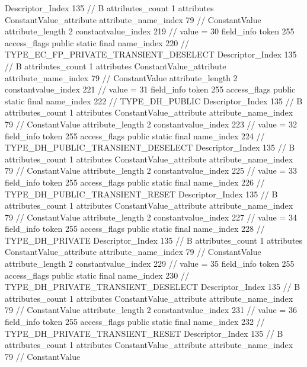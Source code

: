 {{{{{				Descriptor_Index	135		// B
				attributes_count	1
				attributes {
				ConstantValue_attribute {
					attribute_name_index	79		// ConstantValue
					attribute_length	2
					constantvalue_index	219		// value = 30
				}
				}
			}
			field_info {
				token	255
				access_flags	public static final
				name_index	220		// TYPE_EC_FP_PRIVATE_TRANSIENT_DESELECT
				Descriptor_Index	135		// B
				attributes_count	1
				attributes {
				ConstantValue_attribute {
					attribute_name_index	79		// ConstantValue
					attribute_length	2
					constantvalue_index	221		// value = 31
				}
				}
			}
			field_info {
				token	255
				access_flags	public static final
				name_index	222		// TYPE_DH_PUBLIC
				Descriptor_Index	135		// B
				attributes_count	1
				attributes {
				ConstantValue_attribute {
					attribute_name_index	79		// ConstantValue
					attribute_length	2
					constantvalue_index	223		// value = 32
				}
				}
			}
			field_info {
				token	255
				access_flags	public static final
				name_index	224		// TYPE_DH_PUBLIC_TRANSIENT_DESELECT
				Descriptor_Index	135		// B
				attributes_count	1
				attributes {
				ConstantValue_attribute {
					attribute_name_index	79		// ConstantValue
					attribute_length	2
					constantvalue_index	225		// value = 33
				}
				}
			}
			field_info {
				token	255
				access_flags	public static final
				name_index	226		// TYPE_DH_PUBLIC_TRANSIENT_RESET
				Descriptor_Index	135		// B
				attributes_count	1
				attributes {
				ConstantValue_attribute {
					attribute_name_index	79		// ConstantValue
					attribute_length	2
					constantvalue_index	227		// value = 34
				}
				}
			}
			field_info {
				token	255
				access_flags	public static final
				name_index	228		// TYPE_DH_PRIVATE
				Descriptor_Index	135		// B
				attributes_count	1
				attributes {
				ConstantValue_attribute {
					attribute_name_index	79		// ConstantValue
					attribute_length	2
					constantvalue_index	229		// value = 35
				}
				}
			}
			field_info {
				token	255
				access_flags	public static final
				name_index	230		// TYPE_DH_PRIVATE_TRANSIENT_DESELECT
				Descriptor_Index	135		// B
				attributes_count	1
				attributes {
				ConstantValue_attribute {
					attribute_name_index	79		// ConstantValue
					attribute_length	2
					constantvalue_index	231		// value = 36
				}
				}
			}
			field_info {
				token	255
				access_flags	public static final
				name_index	232		// TYPE_DH_PRIVATE_TRANSIENT_RESET
				Descriptor_Index	135		// B
				attributes_count	1
				attributes {
				ConstantValue_attribute {
					attribute_name_index	79		// ConstantValue
}}}}}}}
